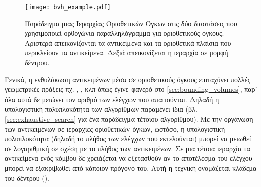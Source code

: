 \begin{figure}[h]
    \centering
    \texttt{[image: bvh\_example.pdf]}
    \caption[Οπτικοποίηση μιας Ιεραρχίας Οριοθετικών Όγκων]{
        Παράδειγμα μιας Ιεραρχίας Οριοθετικών Όγκων στις δύο 
        διαστάσεις που χρησιμοποιεί ορθογώνια παραλληλόγραμμα 
        για οριοθετικούς όγκους.
        Αριστερά απεικονίζονται τα αντικείμενα και τα οριοθετικά 
        πλαίσια που περικλείουν τα αντικείμενα. Δεξιά απεικονίζεται 
        η ιεραρχία σε μορφή δέντρου.
        }
    \label{fig:bvh_example_2d}
\end{figure}

Γενικά, η ενθυλάκωση αντικειμένων μέσα σε οριοθετικούς όγκους επιταχύνει 
πολλές γεωμετρικές πράξεις πχ. , ,
κλπ όπως έγινε φανερό στο \ref{sec:bounding_volumes},
παρ' όλα αυτά δε μειώνει τον αριθμό των ελέγχων που απαιτούνται.
Δηλαδή η υπολογιστική πολυπλοκότητα των αλγορίθμων παραμένει ίδια
(βλ. \ref{sec:exhaustive_search} για ένα παράδειγμα τέτοιου αλγορίθμου). 
Με την οργάνωση των αντικειμένων σε ιεραρχίες 
οριοθετικών όγκων, ωστόσο, η υπολογιστική πολυπλοκότητα (δηλαδή το πλήθος 
των ελέγχων που εκτελούνται) μπορεί να μειωθεί 
σε λογαριθμική σε σχέση με το πλήθος των αντικειμένων.
Σε μια τέτοια ιεραρχία τα αντικείμενα ενός κόμβου δε χρειάζεται 
να εξετασθούν αν το αποτέλεσμα του ελέγχου μπορεί να εξακριβωθεί 
από κάποιον πρόγονό του.
Αυτή η τεχνική ονομάζεται κλάδεμα του δέντρου ().


